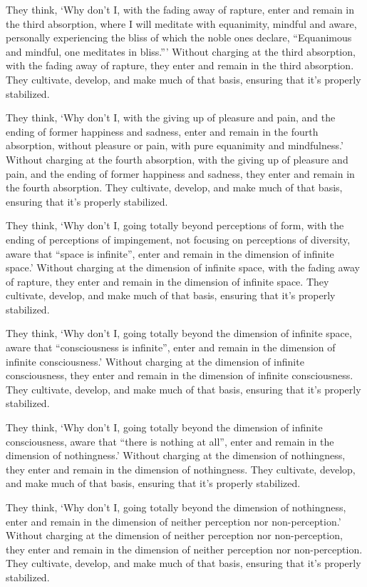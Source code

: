 \documentclass[12pt,openany]{book}%
\begin{document}
They think, ‘Why don’t I, with the fading away of rapture, enter and remain in the third absorption, where I will meditate with equanimity, mindful and aware, personally experiencing the bliss of which the noble ones declare, “Equanimous and mindful, one meditates in bliss.”’ Without charging at the third absorption, with the fading away of rapture, they enter and remain in the third absorption. They cultivate, develop, and make much of that basis, ensuring that it’s properly stabilized. 

They think, ‘Why don’t I, with the giving up of pleasure and pain, and the ending of former happiness and sadness, enter and remain in the fourth absorption, without pleasure or pain, with pure equanimity and mindfulness.’ Without charging at the fourth absorption, with the giving up of pleasure and pain, and the ending of former happiness and sadness, they enter and remain in the fourth absorption. They cultivate, develop, and make much of that basis, ensuring that it’s properly stabilized. 

They think, ‘Why don’t I, going totally beyond perceptions of form, with the ending of perceptions of impingement, not focusing on perceptions of diversity, aware that “space is infinite”, enter and remain in the dimension of infinite space.’ Without charging at the dimension of infinite space, with the fading away of rapture, they enter and remain in the dimension of infinite space. They cultivate, develop, and make much of that basis, ensuring that it’s properly stabilized. 

They think, ‘Why don’t I, going totally beyond the dimension of infinite space, aware that “consciousness is infinite”, enter and remain in the dimension of infinite consciousness.’ Without charging at the dimension of infinite consciousness, they enter and remain in the dimension of infinite consciousness. They cultivate, develop, and make much of that basis, ensuring that it’s properly stabilized. 

They think, ‘Why don’t I, going totally beyond the dimension of infinite consciousness, aware that “there is nothing at all”, enter and remain in the dimension of nothingness.’ Without charging at the dimension of nothingness, they enter and remain in the dimension of nothingness. They cultivate, develop, and make much of that basis, ensuring that it’s properly stabilized. 

They think, ‘Why don’t I, going totally beyond the dimension of nothingness, enter and remain in the dimension of neither perception nor non-perception.’ Without charging at the dimension of neither perception nor non-perception, they enter and remain in the dimension of neither perception nor non-perception. They cultivate, develop, and make much of that basis, ensuring that it’s properly stabilized. 
\end{document}
